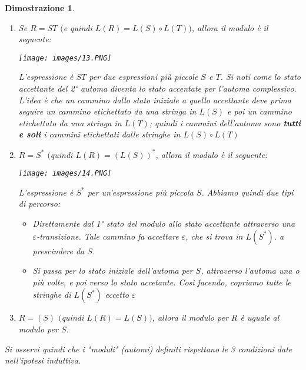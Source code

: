 \documentclass[12pt]{article}
\newtheorem{Dimostrazione}{Dimostrazione}[subsection]
\begin{document}
\begin{Dimostrazione}
\begin{enumerate}
        \begin{center}
                \hspace*{-1cm}
                \texttt{[image: images/12.PNG]}
        \end{center}
        L'espressione è $S + T$ per due espressioni più piccole $S$ e $T$. Partendo dal nuovo stato iniziale, possiamo andare nello stato iniziale dell'automa per T o nello stato iniziale dell'automa per S. Possiamo quindi arrivare nello stato accetante di uno dei due atomi seguendo un cammino etichettato da una stringa che si trova o in $L(S)$ o in $L(T)$. Una volta arrivati in uno dei due stati accettanti per $L(S)$ o $L(T)$, possiamo usare uno dei due archi $\varepsilon$ per arrivare nello stato accetante del nuovo automa. Il linguaggio riconosciuto è pertanto $L(S) \cup L(T)$

        \item Se $R = ST$ $($e quindi $L(R) = L(S) \circ L(T))$, allora il modulo è il seguente:
        \begin{center}
                \hspace*{-1cm}
                \texttt{[image: images/13.PNG]}
        \end{center}
        L'espressione è $ST$ per due espressioni più piccole $S$ e $T$. Si noti come lo stato accettante del 2° automa diventa lo stato accentate per l'automa complessivo. L'idea è che un cammino dallo stato iniziale a quello accettante deve prima seguire un cammino etichettato da una stringa in $L(S)$ e poi un cammino etichettato da una stringa in $L(T)$; quindi i cammini dell'automa sono \textbf{tutti e soli} i cammini etichettati dalle stringhe in $L(S) \circ L(T)$

        \item $R = S^*$ $($quindi $L(R) = (L(S))^*$, allora il modulo è il seguente:
        \begin{center}
                \hspace*{-1cm}
                \texttt{[image: images/14.PNG]}
        \end{center}
        L'espressione è $S^*$ per un'espressione più piccola $S$. Abbiamo quindi due tipi di percorso:
        \begin{itemize}
            \item Direttamente dal 1° stato del modulo allo stato accettante attraverso una $\varepsilon$-transizione. Tale cammino fa accettare $\varepsilon$, che si trova in $L(S^*)$. a prescindere da $S$.
            \item Si passa per lo stato iniziale dell'automa per $S$, attraverso l'automa una o più volte, e poi verso lo stato accetante. Così facendo, copriamo tutte le stringhe di $L(S^*)$ eccetto $\varepsilon$
        \end{itemize}
        \item $R = (S)$ $($quindi $L(R) = L(S))$, allora il modulo per $R$ è uguale al modulo per $S$.
    \end{enumerate}
    Si osservi quindi che i "moduli" (automi) definiti rispettano le 3 condizioni date nell'ipotesi induttiva.
\end{Dimostrazione}
\end{document}
